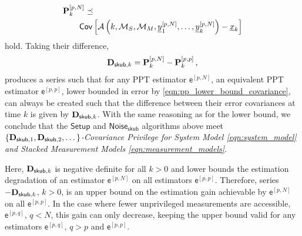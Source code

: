 \documentclass[conference]{IEEEtran}
\theoremstyle{definition}
\theoremstyle{remark}
\begin{document}
\begin{equation}\label{eqn:pN_cov_bound}
  \begin{split}
    &\mat{P}_k^{[p,N]} \preceq\\
    &\qquad \mathsf{Cov}\left[\mathcal{A}\left(k,\mathcal{M}_S,\mathcal{M}_M,\vec{y}_1^{[p,N]},\dots,\vec{y}_k^{[p,N]}\right) - \vec{x}_k\right]
  \end{split}
\end{equation}
hold. Taking their difference,
\begin{equation}\label{eqn:unpriv_priv_skub_difference_series}
  \mat{D}_{\mathsf{skub},k} = \mat{P}_k^{[p,N]} - \mat{P}_k^{[p,p]}\,,
\end{equation}
produces a series such that for any PPT estimator $\mathsf{e}^{[p,N]}$, an equivalent PPT estimator $\mathsf{e}^{[p,p]}$, lower bounded in error by \eqref{eqn:pp_lower_bound_covariance}, can always be created such that the difference between their error covariances at time $k$ is given by ${{\mathbf{D}}}_{\mathsf{skub},k}$. With the same reasoning as for the lower bound, we conclude that the $\mathsf{Setup}$ and $\mathsf{Noise}_{\mathsf{skub}}$ algorithms above meet \textit{$\{{{\mathbf{D}}}_{\mathsf{skub},1},{{\mathbf{D}}}_{\mathsf{skub},2},\dots\}$-Covariance Privilege for System Model \eqref{eqn:system_model} and Stacked Measurement Models \eqref{eqn:measurement_models}}.

Here, ${{\mathbf{D}}}_{\mathsf{skub},k}$ is negative definite for all $k>0$ and lower bounds the estimation degradation of an estimator $\mathsf{e}^{[p,N]}$ on all estimators $\mathsf{e}^{[p,p]}$. Therefore, series $-{{\mathbf{D}}}_{\mathsf{skub},k}$, $k>0$, is an upper bound on the estimation gain achievable by $\mathsf{e}^{[p,N]}$ on all $\mathsf{e}^{[p,p]}$. In the case where fewer unprivileged measurements are accessible, $\mathsf{e}^{[p,q]}$, $q<N$, this gain can only decrease, keeping the upper bound valid for any estimators $\mathsf{e}^{[p,q]}$, $q>p$ and $\mathsf{e}^{[p,p]}$.

% 
%                                 
%                                 
%                                 
% 
\end{document}
